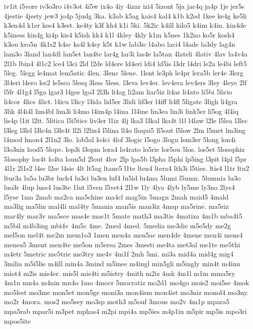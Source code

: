 {iv1it
i5vore
iv3o3ro
i4v3ot
4i5w
ix4o
4iy
4izar
izi4
5izont
5ja
jac4q
ja4p
1je
jer5s
4jestie
4jesty
jew3
jo4p
5judg
3ka.
k3ab
k5ag
kais4
kal4
k1b
k2ed
1kee
ke4g
ke5li
k3en4d
k1er
kes4
k3est.
ke4ty
k3f
kh4
k1i
5ki.
5k2ic
k4ill
kilo5
k4im
k4in.
kin4de
k5iness
kin4g
ki4p
kis4
k5ish
kk4
k1l
4kley
4kly
k1m
k5nes
1k2no
ko5r
kosh4
k3ou
kro5n
4k1s2
k4sc
ks4l
k4sy
k5t
k1w
lab3ic
l4abo
laci4
l4ade
la3dy
lag4n
lam3o
3land
lan4dl
lan5et
lan4te
lar4g
lar3i
las4e
la5tan
4lateli
4lativ
4lav
la4v4a
2l1b
lbin4
4l1c2
lce4
l3ci
2ld
l2de
ld4ere
ld4eri
ldi4
ld5is
l3dr
l4dri
le2a
le4bi
left5
5leg.
5legg
le4mat
lem5atic
4len.
3lenc
5lene.
1lent
le3ph
le4pr
lera5b
ler4e
3lerg
3l4eri
l4ero
les2
le5sco
5lesq
3less
5less.
l3eva
lev4er.
lev4era
lev4ers
3ley
4leye
2lf
l5fr
4l1g4
l5ga
lgar3
l4ges
lgo3
2l3h
li4ag
li2am
liar5iz
li4as
li4ato
li5bi
5licio
li4cor
4lics
4lict.
l4icu
l3icy
l3ida
lid5er
3lidi
lif3er
l4iff
li4fl
5ligate
3ligh
li4gra
3lik
4l4i4l
lim4bl
lim3i
li4mo
l4im4p
l4ina
1l4ine
lin3ea
lin3i
link5er
li5og
4l4iq
lis4p
l1it
l2it.
5litica
l5i5tics
liv3er
l1iz
4lj
lka3
l3kal
lka4t
l1l
l4law
l2le
l5lea
l3lec
l3leg
l3lel
l3le4n
l3le4t
ll2i
l2lin4
l5lina
ll4o
lloqui5
ll5out
l5low
2lm
l5met
lm3ing
l4mod
lmon4
2l1n2
3lo.
lob5al
lo4ci
4lof
3logic
l5ogo
3logu
lom3er
5long
lon4i
l3o3niz
lood5
5lope.
lop3i
l3opm
lora4
lo4rato
lo5rie
lor5ou
5los.
los5et
5losophiz
5losophy
los4t
lo4ta
loun5d
2lout
4lov
2lp
lpa5b
l3pha
l5phi
lp5ing
l3pit
l4pl
l5pr
4l1r
2l1s2
l4sc
l2se
l4sie
4lt
lt5ag
ltane5
l1te
lten4
ltera4
lth3i
l5ties.
ltis4
l1tr
ltu2
ltur3a
lu5a
lu3br
luch4
lu3ci
lu3en
luf4
lu5id
lu4ma
5lumi
l5umn.
5lumnia
lu3o
luo3r
4lup
luss4
lus3te
1lut
l5ven
l5vet4
2l1w
1ly
4lya
4lyb
ly5me
ly3no
2lys4
l5yse
1ma
2mab
ma2ca
ma5chine
ma4cl
mag5in
5magn
2mah
maid5
4mald
ma3lig
ma5lin
mal4li
mal4ty
5mania
man5is
man3iz
4map
ma5rine.
ma5riz
mar4ly
mar3v
ma5sce
mas4e
mas1t
5mate
math3
ma3tis
4matiza
4m1b
mba4t5
m5bil
m4b3ing
mbi4v
4m5c
4me.
2med
4med.
5media
me3die
m5e5dy
me2g
mel5on
mel4t
me2m
mem1o3
1men
men4a
men5ac
men4de
4mene
men4i
mens4
mensu5
3ment
men4te
me5on
m5ersa
2mes
3mesti
me4ta
met3al
me1te
me5thi
m4etr
5metric
me5trie
me3try
me4v
4m1f
2mh
5mi.
mi3a
mid4a
mid4g
mig4
3milia
m5i5lie
m4ill
min4a
3mind
m5inee
m4ingl
min5gli
m5ingly
min4t
m4inu
miot4
m2is
mis4er.
mis5l
mis4ti
m5istry
4mith
m2iz
4mk
4m1l
m1m
mma5ry
4m1n
mn4a
m4nin
mn4o
1mo
4mocr
5mocratiz
mo2d1
mo4go
mois2
moi5se
4mok
mo5lest
mo3me
mon5et
mon5ge
moni3a
mon4ism
mon4ist
mo3niz
monol4
mo3ny.
mo2r
4mora.
mos2
mo5sey
mo3sp
moth3
m5ouf
3mous
mo2v
4m1p
mpara5
mpa5rab
mpar5i
m3pet
mphas4
m2pi
mpi4a
mp5ies
m4p1in
m5pir
mp5is
mpo3ri
mpos5ite
}

